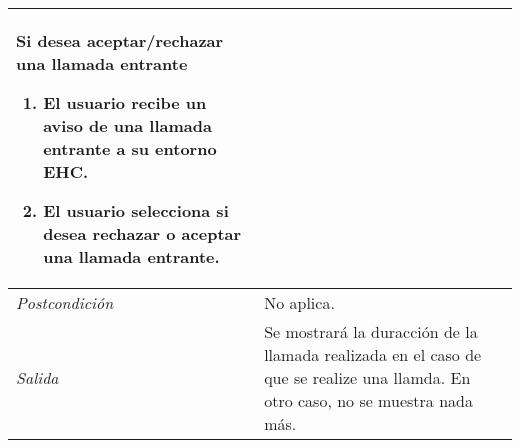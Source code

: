 \begin{center}
\begin{tabular}{|p{3cm}|p{4cm}|p{4cm}|p{4cm}|}
{    Si desea aceptar/rechazar una llamada entrante
    \begin{enumerate}
    \item El usuario recibe un aviso de una llamada entrante a su entorno EHC.
    \item El usuario selecciona si desea rechazar o aceptar una llamada entrante.
    \end{enumerate}
    } \\
    \hline \textit{Postcondici\'on} & \multicolumn{3}{|p{9cm}|}{No aplica.} \\
    \hline \textit{Salida} & \multicolumn{3}{|p{9cm}|}{Se mostrar\'a la duracci\'on de la llamada realizada en el caso de que se realize una llamda. En otro caso, no se muestra nada m\'as.} \\ \hline
    \end{tabular}
\end{center}
